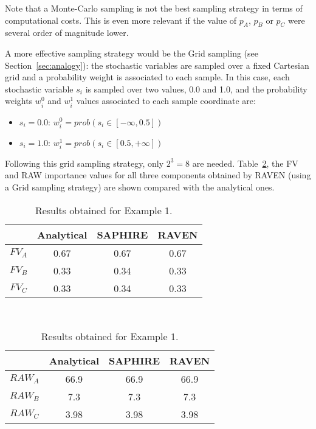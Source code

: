 Note that a Monte-Carlo sampling is not the best sampling strategy in terms of computational 
costs. This is even more relevant if the value of $p_A$, $p_B$ or $p_C$ were several order of 
magnitude lower. 

A more effective sampling strategy would be the Grid sampling (see Section~\ref{sec:analogy}): 
the stochastic variables 
are sampled over a fixed Cartesian grid and a probability weight is associated to each sample. 
In this case, each stochastic variable $s_i$ is sampled over two values, 0.0 and 1.0, and the 
probability weights $w_i^0$ and $w_i^1$ values associated to each sample coordinate are:
\begin{itemize}
  \item $s_i=0.0$: $w_i^0=prob(s_i \in [-\infty,0.5])$
  \item $s_i=1.0$: $w_i^1=prob(s_i \in [0.5,+\infty])$
\end{itemize}
Following this grid sampling strategy, only $2^3=8$ are needed.
Table~\ref{tab:example1}, the FV and RAW importance values for all three components obtained by RAVEN (using a 
Grid sampling strategy) are shown compared with the analytical ones.

\begin{table}
    \caption{Results obtained for Example 1.}
    \centering
    \begin{minipage}{.5\linewidth}
      \centering
      \begin{tabular}{c | c | c | c} 
        \hline 
         & Analytical & SAPHIRE & RAVEN \\ 
        \hline 
        $FV_A$ & 0.67 & 0.67 & 0.67  \\
        $FV_B$ & 0.33 & 0.34 & 0.33   \\
        $FV_C$ & 0.33 & 0.34 & 0.33   \\
        \hline 
      \end{tabular}
    \end{minipage} \\[2ex] 
    \begin{minipage}{.5\linewidth}
      \centering
      \begin{tabular}{c | c | c | c} 
        \hline 
         & Analytical & SAPHIRE & RAVEN \\ 
        \hline 
        $RAW_A$ & 66.9  & 66.9 & 66.9  \\
        $RAW_B$ & 7.3  & 7.3 & 7.3   \\
        $RAW_C$ & 3.98 & 3.98 & 3.98   \\
        \hline 
      \end{tabular}
    \end{minipage} 
    \label{tab:example1}
\end{table}

